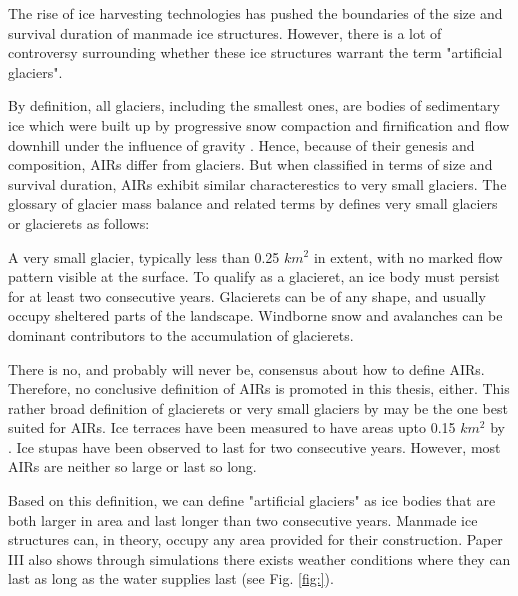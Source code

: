The rise of ice harvesting technologies has pushed the boundaries of the size and survival duration of manmade
ice structures. However, there is a lot of controversy surrounding whether these ice structures warrant the term
"artificial glaciers".

By definition, all glaciers, including the smallest ones, are bodies of sedimentary ice which were built up by
progressive snow compaction and firnification and flow downhill under the influence of gravity
\citet{Bennandevans, 2010}. Hence, because of their genesis and composition, AIRs differ from glaciers. But when
classified in terms of size and survival duration, AIRs exhibit similar characterestics to very small glaciers.
The glossary of glacier mass balance and related terms by \citet{cogleyGlossaryGlacierMass2010} defines very
small glaciers or glacierets as follows:

\begin{thesis_quotation}
  A very small glacier, typically less than 0.25 $km^2$ in extent, with no marked flow pattern
  visible at the surface. To qualify as a glacieret, an ice body must persist for at least two consecutive
  years. Glacierets can be of any shape, and usually occupy sheltered parts of the landscape. Windborne snow and
  avalanches can be dominant contributors to the accumulation of glacierets. 
\end{thesis_quotation}

There is no, and probably will never be, consensus about how to define AIRs. Therefore, no conclusive definition
of AIRs is promoted in this thesis, either. This rather broad definition of glacierets or very small glaciers by
\citet{cogleyGlossaryGlacierMass2010} may be the one best suited for AIRs. Ice terraces have been measured to
have areas upto 0.15 $km^2$ by \citet{nusserSociohydrologyArtificialGlaciers2019}. Ice stupas have been observed
to last for two consecutive years. However, most AIRs are neither so large or last so long.

Based on this definition, we can define "artificial glaciers" as ice bodies that are both larger in area and
last longer than two consecutive years. Manmade ice structures can, in theory, occupy any area provided for
their construction. Paper III also shows through simulations there exists weather conditions where they can last
as long as the water supplies last (see Fig. \ref{fig:}).




